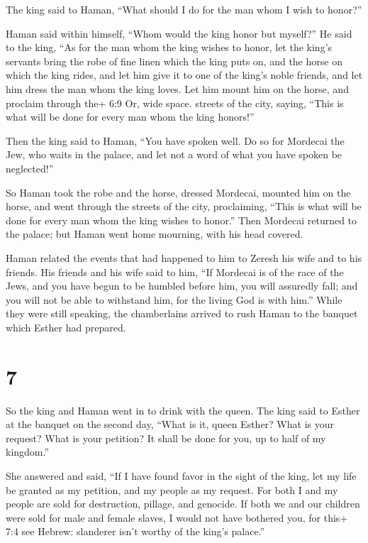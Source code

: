  The king said to Haman, ``What should I do for the man whom
I wish to honor?''

Haman said within himself, ``Whom would the king honor but myself?''
 He said to the king, ``As for the man whom the king wishes
to honor,  let the king's servants bring the robe of fine
linen which the king puts on, and the horse on which the king rides,
 and let him give it to one of the king's noble friends, and
let him dress the man whom the king loves. Let him mount him on the
horse, and proclaim through the+ 6:9 Or, wide space. streets of the
city, saying, ``This is what will be done for every man whom the king
honors!''

 Then the king said to Haman, ``You have spoken well. Do so
for Mordecai the Jew, who waits in the palace, and let not a word of
what you have spoken be neglected!''

 So Haman took the robe and the horse, dressed Mordecai,
mounted him on the horse, and went through the streets of the city,
proclaiming, ``This is what will be done for every man whom the king
wishes to honor.''  Then Mordecai returned to the palace;
but Haman went home mourning, with his head covered.

 Haman related the events that had happened to him to
Zeresh his wife and to his friends. His friends and his wife said to
him, ``If Mordecai is of the race of the Jews, and you have begun to be
humbled before him, you will assuredly fall; and you will not be able to
withstand him, for the living God is with him.''  While
they were still speaking, the chamberlains arrived to rush Haman to the
banquet which Esther had prepared.

\hypertarget{section-6}{%
\section{7}\label{section-6}}

 So the king and Haman went in to drink with the queen.
 The king said to Esther at the banquet on the second day,
``What is it, queen Esther? What is your request? What is your petition?
It shall be done for you, up to half of my kingdom.''

 She answered and said, ``If I have found favor in the sight
of the king, let my life be granted as my petition, and my people as my
request.  For both I and my people are sold for destruction,
pillage, and genocide. If both we and our children were sold for male
and female slaves, I would not have bothered you, for this+ 7:4 see
Hebrew: slanderer isn't worthy of the king's palace.''

